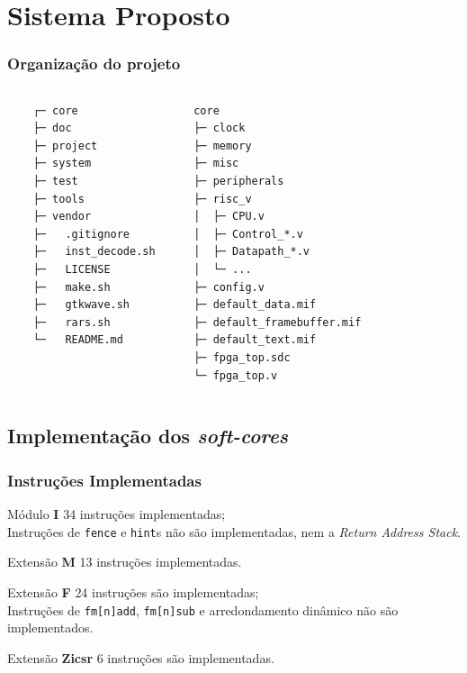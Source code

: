 \documentclass[aspectratio=169]{beamer}
\begin{document}
\section{Sistema Proposto}
    \begin{frame}[fragile]
        \frametitle{Organização do projeto}
        \footnotesize{
        \begin{columns}
            \begin{verbatim}
    ┌─ core
    ├─ doc
    ├─ project
    ├─ system
    ├─ test
    ├─ tools
    ├─ vendor
    ├─   .gitignore
    ├─   inst_decode.sh
    ├─   LICENSE
    ├─   make.sh
    ├─   gtkwave.sh
    ├─   rars.sh
    └─   README.md
        \end{verbatim}
        \vfill
        \begin{verbatim}
   core
   ├─ clock
   ├─ memory
   ├─ misc
   ├─ peripherals
   ├─ risc_v
   │  ├─ CPU.v
   │  ├─ Control_*.v
   │  ├─ Datapath_*.v
   │  └─ ...
   ├─ config.v
   ├─ default_data.mif
   ├─ default_framebuffer.mif
   ├─ default_text.mif
   ├─ fpga_top.sdc
   └─ fpga_top.v
        \end{verbatim}
        \vfill
        \end{columns}}
    \end{frame}

    \subsection{Implementação dos \textit{soft-cores}}
    \begin{frame}
        \frametitle{Instruções Implementadas}
        \begin{block}{Módulo \textbf{I}}
            {34 instruções implementadas;\\
                Instruções de \texttt{fence} e \texttt{hint}s não são implementadas,
                nem a \textit{Return Address Stack}.
            }
        \end{block}
        \begin{block}{Extensão \textbf{M}}
            {13 instruções implementadas.}
        \end{block}
        \begin{block}{Extensão \textbf{F}}
            {24 instruções são implementadas;\\
                Instruções de \texttt{fm[n]add}, \texttt{fm[n]sub} e arredondamento dinâmico
                não são implementados.}
        \end{block}
        \begin{block}{Extensão \textbf{Zicsr}}
            {6 instruções são implementadas.}
        \end{block}
    \end{frame}
\end{document}
